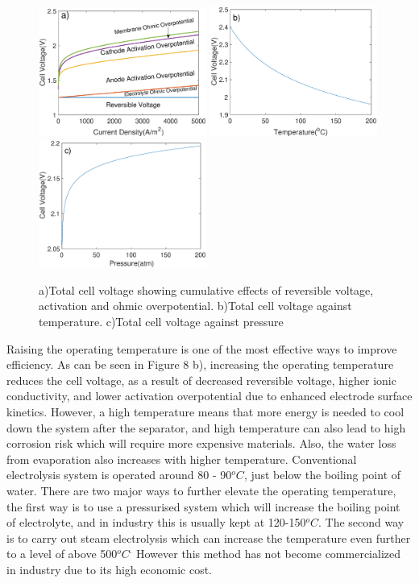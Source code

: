 \begin{figure}[h]
\includegraphics[width=5.5cm]{total.eps}
\includegraphics[width=5.5cm]{cellT.eps}
\includegraphics[width=5.5cm]{cellP.eps}
\caption{a)Total cell voltage showing cumulative effects of reversible voltage, activation and ohmic overpotential. b)Total cell voltage against temperature. c)Total cell voltage against pressure}
\label{fig:}
\end{figure}
Raising the operating temperature is one of the most effective ways to improve efficiency. As can be seen in Figure 8 b), increasing the operating temperature reduces the cell voltage, as a result of decreased reversible voltage, higher ionic conductivity, and lower activation overpotential due to enhanced electrode surface kinetics. However, a high temperature means that more energy is needed to cool down the system after the separator, and high temperature can also lead to high corrosion risk which will require more expensive materials. Also, the water loss from evaporation also increases with higher temperature. Conventional electrolysis system is operated around 80 - 90$^oC$, just below the boiling point of water. There are two major ways to further elevate the operating temperature, the first way is to use a pressurised system which will increase the boiling point of electrolyte, and in industry this is usually kept at 120-150$^oC$. The second way is to carry out steam electrolysis which can increase the temperature even further to a level of above 500$^oC^.$ However this method has not become commercialized in industry due to its high economic cost.\cite{temp} \cite{reversible} \\
